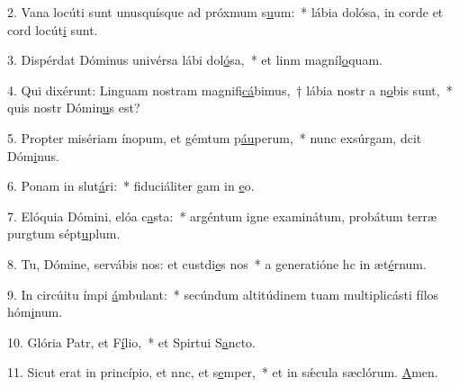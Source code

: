 2. Vana locúti sunt unusquísque ad próxmum s\uline{u}um:~* lábia dolósa, in corde et cord locút\uline{i} sunt.\par 
3. Dispérdat Dóminus univérsa lábi dol\uline{ó}sa,~* et linm magníl\uline{o}quam.\par 
4. Qui dixérunt: Linguam nostram magnifi\uline{cá}bimus,~† lábia nostr a n\uline{o}bis sunt,~* quis nostr Dómin\uline{u}s est?\par 
5. Propter misériam ínopum, et gémtum p\uline{áu}perum,~* nunc exsúrgam, dcit Dóm\uline{i}nus.\par 
6. Ponam in slut\uline{á}ri:~* fiduciáliter gam in \uline{e}o.\par 
7. Elóquia Dómini, elóa c\uline{a}sta:~* argéntum igne examinátum, probátum terræ purgtum sépt\uline{u}plum.\par 
8. Tu, Dómine, servábis nos: et custdi\uline{e}s nos~* a generatióne hc in æt\uline{é}rnum.\par 
9. In circúitu ímpi \uline{á}mbulant:~* secúndum altitúdinem tuam multiplicásti fílos hóm\uline{i}num.\par 
10. Glória Patr, et F\uline{í}lio,~* et Spirtui S\uline{a}ncto.\par 
11. Sicut erat in princípio, et nnc, et s\uline{e}mper,~* et in sǽcula sæclórum. \uline{A}men.\par 
